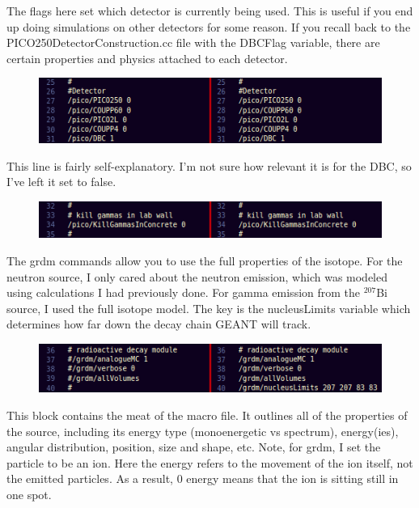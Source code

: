 \documentclass[%
12pt,
twoside,
reprint,
amsmath,amssymb,
aps,
]{article}
\begin{document}
	\noindent The flags here set which detector is currently being used. This is useful if you end up doing simulations on other detectors for some reason. If you recall back to the PICO250DetectorConstruction.cc file with the DBCFlag variable, there are certain properties and physics attached to each detector.

	\begin{figure}[!h]
		\centering
		\includegraphics[scale = 1]{Images/detectors.png}
		\caption{\label{tab:table-name}}
	\end{figure}

	\noindent This line is fairly self-explanatory. I'm not sure how relevant it is for the DBC, so I've left it set to false.
	
	\begin{figure}[!h]
		\centering
		\includegraphics[scale = 1]{Images/gamma_wall.png}
		\caption{\label{tab:table-name}}
	\end{figure}

	\noindent The grdm commands allow you to use the full properties of the isotope. For the neutron source, I only cared about the neutron emission, which was modeled using calculations I had previously done. For gamma emission from the $^{207}$Bi source, I used the full isotope model. The key is the nucleusLimits variable which determines how far down the decay chain GEANT will track.
	
	\begin{figure}[!h]
		\centering
		\includegraphics[scale = 1]{Images/grdm.png}
		\caption{\label{tab:table-name}}
	\end{figure}
	\pagebreak
	\noindent This block contains the meat of the macro file. It outlines all of the properties of the source, including its energy type (monoenergetic vs spectrum), energy(ies), angular distribution, position, size and shape, etc. Note, for grdm, I set the particle to be an ion. Here the energy refers to the movement of the ion itself, not the emitted particles. As a result, 0 energy means that the ion is sitting still in one spot.
	
\end{document}
